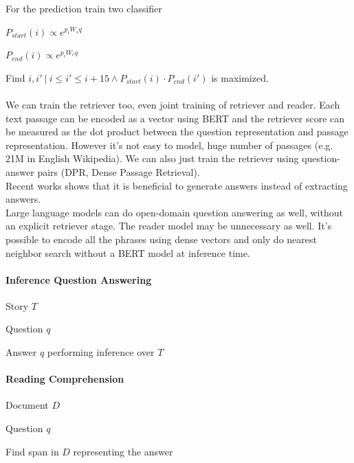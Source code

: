 \documentclass[10pt]{report}
\begin{document}
For the prediction train two classifier\begin{list}{}{}
	\item $P_{start}(i)\propto e^{p_iW_sq}$
	\item $P_{end}(i)\propto e^{p_iW_eq}$
\end{list}
Find $i,i'\:|\:i\leq i'\leq i+15\wedge P_{start}(i)\cdot P_{end}(i')$ is maximized.\\\\
We can train the retriever too, even joint training of retriever and reader. Each text passage can be encoded as a vector using BERT and the retriever score can be measured as the dot product between the question representation and passage representation. However it's not easy to model, huge number of passages (e.g. 21M in English Wikipedia). We can also just train the retriever using question-answer pairs (DPR, Dense Passage Retrieval).\\
Recent works shows that it is beneficial to generate answers instead of extracting answers.\\
Large language models can do open-domain question answering as well, without an explicit retriever stage. The reader model may be unnecessary as well. It's possible to encode all the phrases using dense vectors and only do nearest neighbor search without a BERT model at inference time.
\begin{multicols}{2}
\paragraph{Inference Question Answering}
\begin{list}{}{}
	\item Story $T$
	\item Question $q$
	\item Answer $q$ performing inference over $T$
\end{list}
\paragraph{Reading Comprehension}
\begin{list}{}{}
	\item Document $D$
	\item Question $q$
	\item Find span in $D$ representing the answer
\end{list}
\end{multicols}
\end{document}
